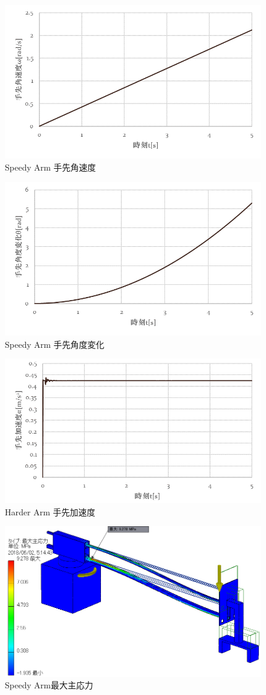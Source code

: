 \documentclass[10pt,b5paper,papersize,dvipdfmx]{jsbook}
\begin{document}
%
\begin{figure}[H]
  \centering
  \includegraphics[width=.68\textwidth]{img/robot25.png}
  \caption{Speedy Arm 手先角速度}
  \label{fig:Speedy Arm 手先角速度}
\end{figure}
\begin{figure}[H]
  \centering
  \includegraphics[width=.68\textwidth]{img/robot26.png}
  \caption{Speedy Arm 手先角度変化}
  \label{fig:Speedy Arm 手先角度変化}
\end{figure}
\begin{figure}[H]
  \centering
  \includegraphics[width=.68\textwidth]{img/robot27.png}
  \caption{Harder Arm 手先加速度}
  \label{fig:Harder Arm 手先加速度2}
\end{figure}
\begin{figure}[H]
  \centering
  \includegraphics[width=.65\textwidth]{img/robot28.png}
  \caption{Speedy Arm最大主応力}
  \label{fig:Speedy Arm最大主応力}
\end{figure}
\end{document}
